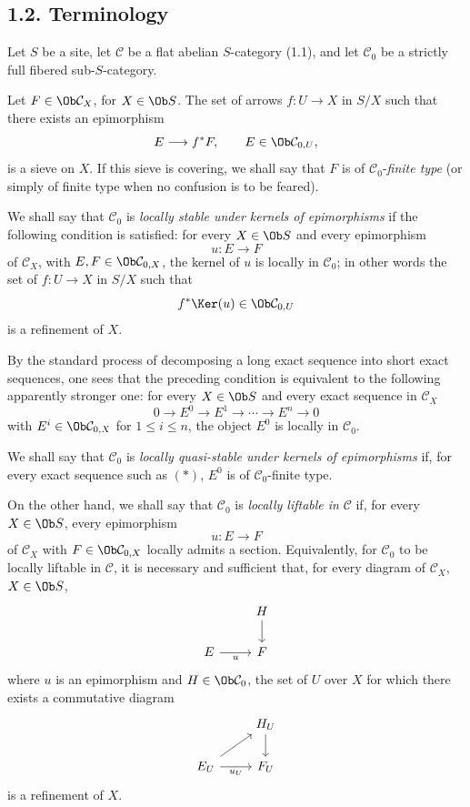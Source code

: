 \subsection*{1.2. Terminology}

Let \(S\) be a site, let \(\mathcal C\) be a flat abelian \(S\)-category (1.1), and let \(\mathcal C_0\) be a strictly full fibered sub-\(S\)-category.

Let \(F\in\Ob \mathcal C_X\), for \(X\in\Ob S\). The set of arrows \(f:U\to X\) in \(S/X\) such that there exists an epimorphism
\[
  E\longrightarrow f^*F,\qquad E\in\Ob \mathcal C_{0,U},
\]
is a sieve on \(X\). If this sieve is covering, we shall say that \(F\) is of \(\mathcal C_0\)-\emph{finite type} (or simply of finite type when no confusion is to be feared).

We shall say that \(\mathcal C_0\) is \emph{locally stable under kernels of epimorphisms} if the following condition is satisfied: for every \(X\in\Ob S\) and every epimorphism
\[
  u:E\longrightarrow F
\]
of \(\mathcal C_X\), with \(E,F\in\Ob\mathcal C_{0,X}\), the kernel of \(u\) is locally in \(\mathcal C_0\); in other words the set of \(f:U\to X\) in \(S/X\) such that
\[
  f^*\Ker(u)\in\Ob\mathcal C_{0,U}
\]
is a refinement of \(X\).

By the standard process of decomposing a long exact sequence into short exact sequences, one sees that the preceding condition is equivalent to the following apparently stronger one: for every \(X\in\Ob S\) and every exact sequence in \(\mathcal C_X\)
\begin{equation}\tag{*}
  0\longrightarrow E^0\longrightarrow E^1\longrightarrow\cdots\longrightarrow E^n\longrightarrow 0
\end{equation}
with \(E^i\in\Ob\mathcal C_{0,X}\) for \(1\leq i\leq n\), the object \(E^0\) is locally in \(\mathcal C_0\).

We shall say that \(\mathcal C_0\) is \emph{locally quasi-stable under kernels of epimorphisms} if, for every exact sequence such as \((*)\), \(E^0\) is of \(\mathcal C_0\)-finite type.

On the other hand, we shall say that \(\mathcal C_0\) is \emph{locally liftable in} \(\mathcal C\) if, for every \(X\in\Ob S\), every epimorphism
\[
  u:E\longrightarrow F
\]
of \(\mathcal C_X\) with \(F\in\Ob\mathcal C_{0,X}\) locally admits a section. Equivalently, for \(\mathcal C_0\) to be locally liftable in \(\mathcal C\), it is necessary and sufficient that, for every diagram of \(\mathcal C_X\), \(X\in\Ob S\),
\[
\begin{tikzcd}
& H \arrow[d]\\
E \arrow[r,"u"'] & F
\end{tikzcd}
\]
where \(u\) is an epimorphism and \(H\in\Ob\mathcal C_0\), the set of \(U\) over \(X\) for which there exists a commutative diagram
\[
\begin{tikzcd}
& H_U \arrow[d]\\
E_U \arrow[r,"u_U"'] \arrow[ur] & F_U
\end{tikzcd}
\]
is a refinement of \(X\).


